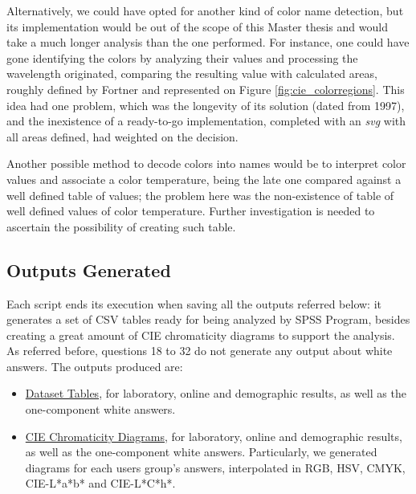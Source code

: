 %
Alternatively, we could have opted for another kind of color name detection, but its implementation would be out of the scope of this Master thesis and would take a much longer
analysis than the one performed. For instance, one could have gone identifying the colors by analyzing their values and processing the wavelength originated, comparing the resulting
value with calculated areas, roughly defined by Fortner \cite{Fortner1997} and represented on Figure \ref{fig:cie_colorregions}. This idea had one problem, which was the longevity
of its solution (dated from 1997), and the inexistence of a ready-to-go implementation, completed with an \emph{svg} with all areas defined, had weighted on the decision. \par
%
Another possible method to decode colors into names would be to interpret color values and associate a color temperature, being the late one compared against a well defined table
of values; the problem here was the non-existence of table of well defined values of color temperature. Further investigation is needed to ascertain the possibility of creating such table.
%
\subsection{Outputs Generated}
\label{subsec:results_outputsgenerated}
%
Each script ends its execution when saving all the outputs referred below: it generates a set of \gls{CSV} tables ready for being analyzed by
SPSS Program, besides creating a great amount of CIE chromaticity diagrams to support the analysis. As referred before, questions 18 to 32 do not generate any output about
white answers. The outputs produced are:
%
\begin{itemize}
  \setlength\itemsep{0.01em}
  \item \ul{Dataset Tables}, for laboratory, online and demographic results, as well as the one-component white answers.
  \item \ul{CIE Chromaticity Diagrams}, for laboratory, online and demographic results, as well as the one-component white answers. Particularly,
  we generated diagrams for each users group's answers, interpolated in RGB, HSV, CMYK, CIE-L*a*b* and CIE-L*C*h*.
\end{itemize}
%
%
